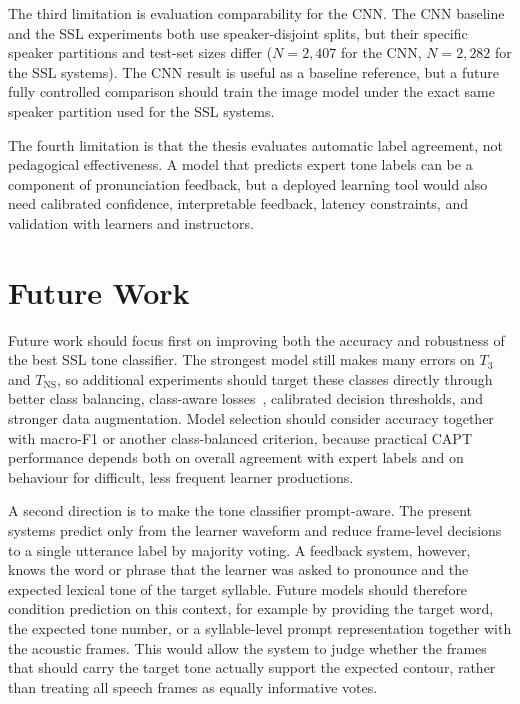 The third limitation is evaluation comparability for the CNN. The CNN baseline
and the SSL experiments both use speaker-disjoint splits, but their specific
speaker partitions and test-set sizes differ ($N=2{,}407$ for the CNN,
$N=2{,}282$ for the SSL systems). The CNN result is useful as a baseline
reference, but a future fully controlled comparison should train the image
model under the exact same speaker partition used for the SSL systems.

The fourth limitation is that the thesis evaluates automatic label agreement,
not pedagogical effectiveness. A model that predicts expert tone labels can be a
component of pronunciation feedback, but a deployed learning tool would also
need calibrated confidence, interpretable feedback, latency constraints, and
validation with learners and instructors.

\section{Future Work}
\label{sec:summary:future}

Future work should focus first on improving both the accuracy and robustness of
the best SSL tone classifier. The strongest model still makes many errors on
\(T_3\) and \(T_{\mathrm{NS}}\), so additional experiments should target these
classes directly through better class balancing, class-aware
losses~\cite{lin2017focal}, calibrated decision thresholds, and stronger data
augmentation. Model selection should consider accuracy together with macro-F1 or
another class-balanced criterion, because practical CAPT performance depends both
on overall agreement with expert labels and on behaviour for difficult, less
frequent learner productions.

A second direction is to make the tone classifier prompt-aware. The present
systems predict only from the learner waveform and reduce frame-level decisions
to a single utterance label by majority voting. A feedback system, however,
knows the word or phrase that the learner was asked to pronounce and the
expected lexical tone of the target syllable. Future models should therefore
condition prediction on this context, for example by providing the target word,
the expected tone number, or a syllable-level prompt representation together
with the acoustic frames. This would allow the system to judge whether the
frames that should carry the target tone actually support the expected contour,
rather than treating all speech frames as equally informative votes.

